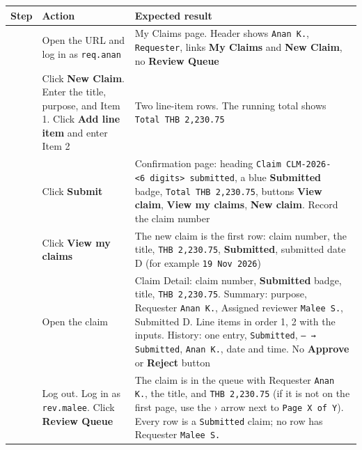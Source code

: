 {\def\LTcaptype{none} %
\begin{longtable}[]{@{}
  >{\raggedright\arraybackslash}p{}
  >{\raggedright\arraybackslash}p{}
  >{\raggedright\arraybackslash}p{}@{}}
\toprule\noalign{}
\begin{minipage}[b]{\linewidth}\raggedright
Step
\end{minipage} & \begin{minipage}[b]{\linewidth}\raggedright
Action
\end{minipage} & \begin{minipage}[b]{\linewidth}\raggedright
Expected result
\end{minipage} \\
\midrule\noalign{}
\endhead
\bottomrule\noalign{}
\endlastfoot
1 & Open the URL and log in as \texttt{req.anan} & My Claims page. Header shows \texttt{Anan K.}, \texttt{Requester}, links \textbf{My Claims} and \textbf{New Claim}, no \textbf{Review Queue} \\
2 & Click \textbf{New Claim}. Enter the title, purpose, and Item 1. Click \textbf{Add line item} and enter Item 2 & Two line-item rows. The running total shows \texttt{Total THB 2,230.75} \\
3 & Click \textbf{Submit} \shot{} & Confirmation page: heading \texttt{Claim\ CLM-2026-\textless{}6\ digits\textgreater{}\ submitted}, a blue \textbf{Submitted} badge, \texttt{Total THB 2,230.75}, buttons \textbf{View claim}, \textbf{View my claims}, \textbf{New claim}. Record the claim number \\
4 & Click \textbf{View my claims} & The new claim is the first row: claim number, the title, \texttt{THB 2,230.75}, \textbf{Submitted}, submitted date D (for example \texttt{19 Nov 2026}) \\
5 & Open the claim \shot{} & Claim Detail: claim number, \textbf{Submitted} badge, title, \texttt{THB 2,230.75}. Summary: purpose, Requester \texttt{Anan K.}, Assigned reviewer \texttt{Malee S.}, Submitted D. Line items in order 1, 2 with the inputs. History: one entry, \texttt{Submitted}, \texttt{– → Submitted}, \texttt{Anan K.}, date and time. No \textbf{Approve} or \textbf{Reject} button \\
6 & Log out. Log in as \texttt{rev.malee}. Click \textbf{Review Queue} & The claim is in the queue with Requester \texttt{Anan K.}, the title, and \texttt{THB 2,230.75} (if it is not on the first page, use the › arrow next to \texttt{Page X of Y}). Every row is a \texttt{Submitted} claim; no row has Requester \texttt{Malee S.} \\

\end{longtable}}
